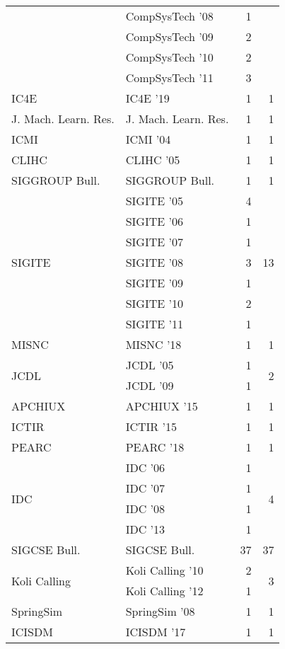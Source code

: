\begin{table*}[t]
\begin{tabular}{llrr}
& CompSysTech '08 & 1 &\\
& CompSysTech '09 & 2 &\\
& CompSysTech '10 & 2 &\\
& CompSysTech '11 & 3 &\\
\multirow{1}{*}{IC4E } & IC4E '19 & 1 & \multirow{1}{*}{1}\\
\multirow{1}{*}{J. Mach. Learn. Res.} & J. Mach. Learn. Res. & 1 & \multirow{1}{*}{1}\\
\multirow{1}{*}{ICMI } & ICMI '04 & 1 & \multirow{1}{*}{1}\\
\multirow{1}{*}{CLIHC } & CLIHC '05 & 1 & \multirow{1}{*}{1}\\
\multirow{1}{*}{SIGGROUP Bull.} & SIGGROUP Bull. & 1 & \multirow{1}{*}{1}\\
\multirow{7}{*}{SIGITE } & SIGITE '05 & 4 & \multirow{7}{*}{13}\\
& SIGITE '06 & 1 &\\
& SIGITE '07 & 1 &\\
& SIGITE '08 & 3 &\\
& SIGITE '09 & 1 &\\
& SIGITE '10 & 2 &\\
& SIGITE '11 & 1 &\\
\multirow{1}{*}{MISNC } & MISNC '18 & 1 & \multirow{1}{*}{1}\\
\multirow{2}{*}{JCDL } & JCDL '05 & 1 & \multirow{2}{*}{2}\\
& JCDL '09 & 1 &\\
\multirow{1}{*}{APCHIUX } & APCHIUX '15 & 1 & \multirow{1}{*}{1}\\
\multirow{1}{*}{ICTIR } & ICTIR '15 & 1 & \multirow{1}{*}{1}\\
\multirow{1}{*}{PEARC } & PEARC '18 & 1 & \multirow{1}{*}{1}\\
\multirow{4}{*}{IDC } & IDC '06 & 1 & \multirow{4}{*}{4}\\
& IDC '07 & 1 &\\
& IDC '08 & 1 &\\
& IDC '13 & 1 &\\
\multirow{1}{*}{SIGCSE Bull.} & SIGCSE Bull. & 37 & \multirow{1}{*}{37}\\
\multirow{2}{*}{Koli Calling } & Koli Calling '10 & 2 & \multirow{2}{*}{3}\\
& Koli Calling '12 & 1 &\\
\multirow{1}{*}{SpringSim } & SpringSim '08 & 1 & \multirow{1}{*}{1}\\
\multirow{1}{*}{ICISDM } & ICISDM '17 & 1 & \multirow{1}{*}{1}\\

\end{tabular}
\end{table*}
